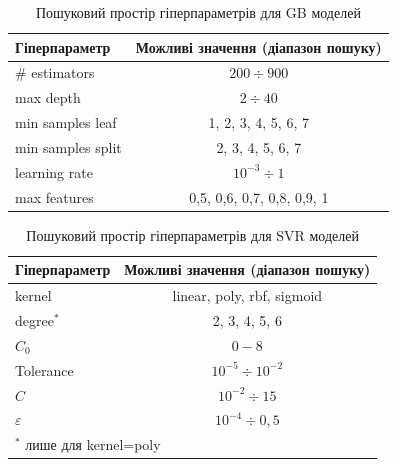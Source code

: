 \documentclass[12pt,a4paper,titlepage,oneside]{book}
\numberwithin{equation}{part}
\begin{document}
\begin{table}[!ht]
\caption{Пошуковий простір гіперпараметрів для GB моделей }
\label{tblGBs}
\centering
\begin{tabular}{|l|c|}
\hline
Гіперпараметр&Можливі значення (діапазон пошуку)\\
\hline
\# estimators&	$200\div900$\\
\hline
max depth&	$2\div40$\\
\hline
min samples leaf &	1, 2, 3, 4, 5, 6, 7\\
\hline
min samples split	&2, 3, 4, 5, 6, 7\\
\hline
learning rate	& $10^{-3}\div1$ \\
\hline
max features &	0,5, 0,6, 0,7, 0,8, 0,9, 1\\
\hline
\end{tabular}
\end{table}

\begin{table}[!ht]
\caption{Пошуковий простір гіперпараметрів для SVR моделей }
\label{tblSVRs}
\centering
\begin{tabular}{|l|c|}
\hline
Гіперпараметр&Можливі значення (діапазон пошуку)\\
\hline
kernel &	linear, poly, rbf, sigmoid\\
\hline
degree$^*$&	2, 3, 4, 5, 6\\
\hline
$C_0$ &	$0-8$\\
\hline
Tolerance	&$10^{-5}\div10^{-2}$\\
\hline
$C$	& $10^{-2}\div15$ \\
\hline
$\varepsilon$ &	$10^{-4}\div0,5$\\
\hline
\multicolumn{2}{l}{$^*$ лише для kernel=poly}\\
\end{tabular}
\end{table}
\end{document}
